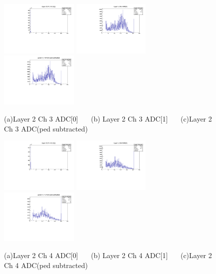 \documentclass[a4paper,11pt]{article}
\theoremstyle{mytheor}
\begin{document}
\begin{figure}[H] 
\vspace*{-0.3cm} 
\includegraphics[width=0.33\textwidth,scale=0.5,trim=0 0 0 0,clip]{plotsdir/file0_test-Layer2_Ch3_adc0-1.pdf} 
\includegraphics[width=0.33\textwidth,scale=0.5,trim=0 0 0 0,clip]{plotsdir/file0_test-Layer2_Ch3_adc1-1.pdf} 
\includegraphics[width=0.33\textwidth,scale=0.5,trim=0 0 0 0,clip]{plotsdir/file0_test-Layer2_Ch3_adcPedsub-1.pdf} 
\caption{(a)Layer 2 Ch 3 ADC[0] ~~~(b) Layer 2 Ch 3 ADC[1] ~~~(c)Layer 2 Ch 3 ADC(ped subtracted) } 
\end{figure} 
\begin{figure}[H] 
\vspace*{-0.3cm} 
\includegraphics[width=0.33\textwidth,scale=0.5,trim=0 0 0 0,clip]{plotsdir/file0_test-Layer2_Ch4_adc0-1.pdf} 
\includegraphics[width=0.33\textwidth,scale=0.5,trim=0 0 0 0,clip]{plotsdir/file0_test-Layer2_Ch4_adc1-1.pdf} 
\includegraphics[width=0.33\textwidth,scale=0.5,trim=0 0 0 0,clip]{plotsdir/file0_test-Layer2_Ch4_adcPedsub-1.pdf} 
\caption{(a)Layer 2 Ch 4 ADC[0] ~~~(b) Layer 2 Ch 4 ADC[1] ~~~(c)Layer 2 Ch 4 ADC(ped subtracted) } 
\end{figure} 
\end{document}

